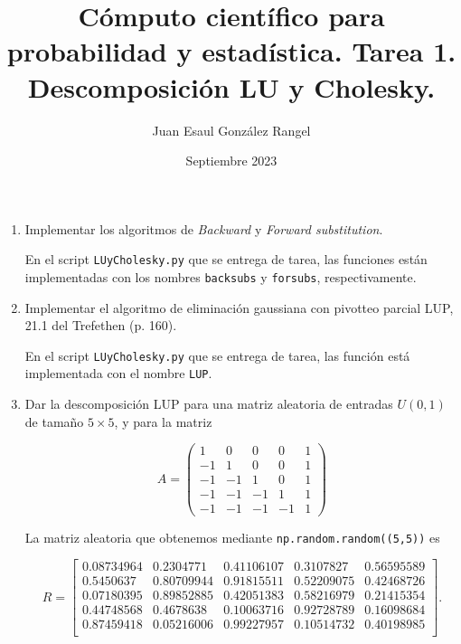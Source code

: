 \documentclass{article}
\title{Cómputo científico para probabilidad y estadística. Tarea 1.\\
Descomposición LU y Cholesky.}
\author{Juan Esaul González Rangel}
\date{Septiembre 2023}
\begin{document}
\maketitle


\begin{enumerate}

    \item Implementar los algoritmos de \textit{Backward} y \textit{Forward substitution}.
    
    En el script \texttt{LUyCholesky.py} que se entrega de tarea, las funciones están implementadas 
    con los nombres \texttt{backsubs} y \texttt{forsubs}, respectivamente.

    \item Implementar el algoritmo de eliminación gaussiana con pivotteo parcial LUP, 21.1 del Trefethen (p. 160).
    
    En el script \texttt{LUyCholesky.py} que se entrega de tarea, las función está implementada
    con el nombre \texttt{LUP}.

    \item Dar la descomposición LUP para una matriz aleatoria de entradas $U (0, 1)$ de tamaño $5 \times 5$, y para la matriz

    \begin{equation}
        A = \begin{pmatrix}
            1 & 0 & 0 & 0 & 1 \\
            -1 & 1 & 0 & 0 & 1 \\
            -1 & -1 & 1 & 0 & 1 \\
            -1 & -1 & -1 & 1 & 1 \\
            -1 & -1 & -1 & -1 & 1
        \end{pmatrix}
    \end{equation}

    La matriz aleatoria que obtenemos mediante \texttt{np.random.random((5,5))} es

    \begin{equation*}
        R = \begin{bmatrix}
            0.08734964 & 0.2304771 & 0.41106107 & 0.3107827 & 0.56595589\\
            0.5450637 & 0.80709944 & 0.91815511 & 0.52209075 & 0.42468726\\
            0.07180395 & 0.89852885 & 0.42051383 & 0.58216979 & 0.21415354\\
            0.44748568 & 0.4678638 & 0.10063716 & 0.92728789 & 0.16098684\\
            0.87459418 & 0.05216006 & 0.99227957 & 0.10514732 & 0.40198985\\
          \end{bmatrix}.
    \end{equation*}


\end{enumerate}
\end{document}
